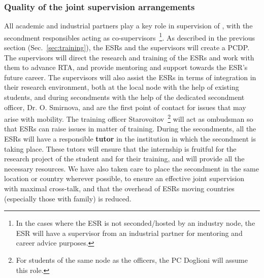 \subsubsection{Quality of the joint supervision arrangements}
\label{sec:jointsuperqual}



All academic and industrial partners play a key role in supervision of \acronym, with the secondment responsibles acting as co-supervisors~\footnote{In the cases where the ESR is not seconded/hosted by an industry node, the ESR will have a supervisor from an industrial partner for mentoring and career advice purposes.}.
As described in the previous section (Sec.~\ref{sec:training}), the ESRs and the supervisors will create a PCDP.  
The supervisors will direct the research and training of the ESRs and work with them to advance RTA, and provide mentoring and support towards the ESR's future career. 
The supervisors will also assist the ESRs in terms of integration in their research environment, both at the local node with the help of existing students, and during secondments with the help of the dedicated secondment officer, Dr. O. Smirnova, and are the first point of contact for issues that may arise with mobility. 
The training officer Starovoitov~\footnote{For students of the same node as the officers, the PC Doglioni will assume this role.} will act as ombudsman so that ESRs can raise issues in matter of training. 
During the secondments, all the ESRs will have a responsible \textbf{tutor} in the institution in which the secondment is taking place. These tutors will ensure that the internship is fruitful for the research project of the student and for their training, and will provide all the necessary resources. 
We have also taken care to place the secondment in the same location or country wherever possible, to ensure an effective joint supervision with maximal cross-talk, and that the overhead of ESRs moving countries (especially those with family) is reduced. 

